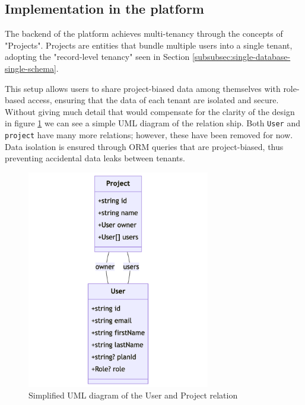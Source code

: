 \subsection{Implementation in the platform}
The backend of the platform achieves multi-tenancy through the concepts of "Projects".
Projects are entities that bundle multiple users into a single tenant, adopting the "record-level tenancy" seen in Section \ref{subsubsec:single-database-single-schema}.

This setup allows users to share \gls{project}-biased data among themselves with role-based access, ensuring that the data of each tenant are isolated and secure.
Without giving much detail that would compensate for the clarity of the design in figure \ref{img04:uml-user-project} we can see a simple UML diagram of the relation ship. 
Both \texttt{User} and \texttt{\gls{project}} have many more relations; however, these have been removed for now.
Data isolation is ensured through ORM queries that are \gls{project}-biased, thus preventing accidental data leaks between tenants.





\begin{figure}[H]\centering
\includegraphics[width=80mm]{img/chap04/fig_simplified_project_concept.png}
\caption{Simplified UML diagram of the User and Project relation}
\label{img04:uml-user-project}
\end{figure}
